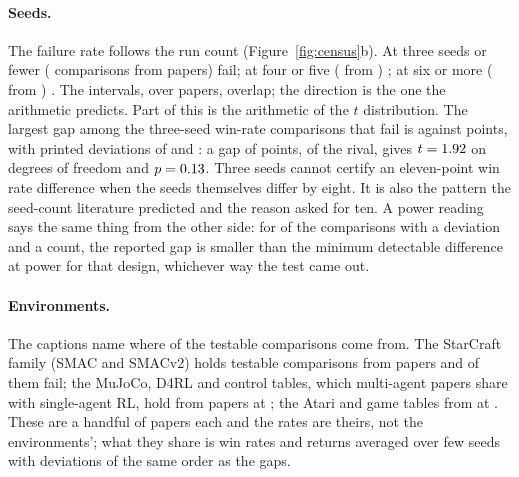 \documentclass[sigconf,anonymous]{aamas}
\begin{document}
\paragraph{Seeds.} The failure rate follows the run count
(Figure~\ref{fig:census}b). At three seeds or fewer (\nRunsLeThreeN{}
comparisons from \nRunsLeThreePapers{} papers) \nRunsLeThreeFailCi{}
fail; at four or five (\nRunsFourToFiveN{} from \nRunsFourToFivePapers{})
\nRunsFourToFiveFailCi{}; at six or more (\nRunsGeSixN{} from
\nRunsGeSixPapers{}) \nRunsGeSixFailCi{}. The intervals, over papers,
overlap; the direction is the one the arithmetic predicts.
Part of this is the arithmetic of the $t$ distribution. The largest gap
among the \nExNThreeSeedFailing{} three-seed win-rate comparisons that fail
is \nExWinner{} against \nExRunner{} points, with printed deviations of
\nExWinnerSd{} and \nExRunnerSd{}: a gap of \nExGap{} points,
\nExRelativeGap{} of the rival, gives $t = 1.92{}$ on \nExDf{} degrees of
freedom and $p = 0.13{}$. Three seeds cannot certify an eleven-point win
rate difference when the seeds themselves differ by eight. It is also the
pattern the seed-count literature predicted \cite{colas2018how,agarwal2021deep}
and the reason \citet{gorsane2022towards} asked for ten. A power reading
says the same thing from the other side: for \nPowerUnderpowered{} of the
\nPowerN{} comparisons with a deviation and a count, the reported gap is
smaller than the minimum detectable difference at \nPowerLevel{} power for
that design, whichever way the test came out.

\paragraph{Environments.} The captions name where \nEnvNamedTestablePct{}
of the testable comparisons come from. The StarCraft family (SMAC and
SMACv2) holds \nEnvStarcraftTestable{} testable comparisons from
\nEnvStarcraftTestablePapers{} papers and \nEnvStarcraftFail{} of them fail;
the MuJoCo, D4RL and control tables, which multi-agent papers share with
single-agent RL, hold \nEnvMujocoTestable{} from
\nEnvMujocoTestablePapers{} papers at \nEnvMujocoFail{}; the Atari and game
tables \nEnvAtariTestable{} from \nEnvAtariTestablePapers{} at
\nEnvAtariFail{}. These are a handful of papers each and the rates are
theirs, not the environments'; what they share is win rates and returns
averaged over few seeds with deviations of the same order as the gaps.
\end{document}
